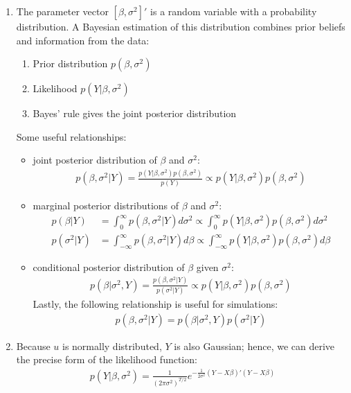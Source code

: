 \begin{enumerate}

\item The parameter vector \([\beta,\sigma^2]'\) is a random variable with a probability distribution.
A Bayesian estimation of this distribution combines prior beliefs and information from the data:
\begin{enumerate}
\item Prior distribution \(p(\beta,\sigma^2)\)
\item Likelihood \(p(Y|\beta,\sigma^2)\)
\item Bayes' rule gives the joint posterior distribution
\end{enumerate}
Some useful relationships:
\begin{itemize}
\item joint posterior distribution of \(\beta \) and \(\sigma^2\):
\begin{align*}
p(\beta,\sigma^2|Y) = \frac{p(Y|\beta,\sigma^2) p(\beta,\sigma^2)}{p(Y)} \propto p(Y|\beta,\sigma^2) p(\beta,\sigma^2)
\end{align*}
\item marginal posterior distributions of \(\beta \) and \(\sigma^2\):
\begin{align*}
p(\beta|Y) &= \int_0^\infty p(\beta,\sigma^2|Y) d\sigma^2
\propto \int_0^\infty p(Y|\beta,\sigma^2) p(\beta,\sigma^2) d\sigma^2
\\
p(\sigma^2|Y) &= \int_{-\infty}^{\infty} p(\beta,\sigma^2|Y) d\beta
\propto \int_{-\infty}^{\infty} p(Y|\beta,\sigma^2) p(\beta,\sigma^2) d\beta
\end{align*}
\item conditional posterior distribution of \(\beta \) given \(\sigma^2\):
\begin{align*}
p(\beta|\sigma^2,Y) = \frac{p(\beta,\sigma^2|Y)}{p(\sigma^2|Y)}
\propto p(Y|\beta,\sigma^2) p(\beta,\sigma^2)
\end{align*}
Lastly, the following relationship is useful for simulations:
\begin{align*}
p(\beta,\sigma^2|Y) = p(\beta|\sigma^2,Y) p(\sigma^2|Y)
\end{align*}
\end{itemize}

\item Because \(u\) is normally distributed, \(Y\) is also Gaussian;
  hence, we can derive the precise form of the likelihood function:
\begin{align*}
p(Y|\beta,\sigma^2) = \frac{1}{{(2\pi \sigma^2)}^{T/2}} e^{-\frac{1}{2\sigma^2} (Y-X\beta)'(Y-X\beta)}
\end{align*}


\end{enumerate}
